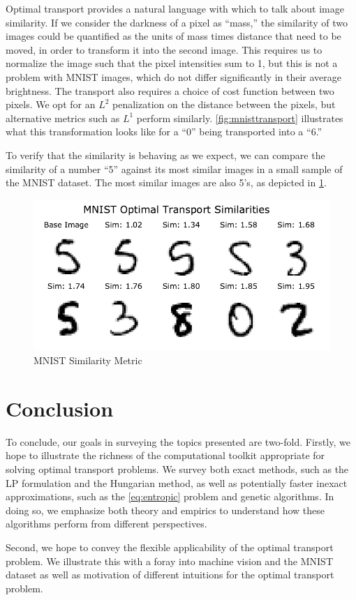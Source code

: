 \documentclass{article}
\theoremstyle{definition}
\theoremstyle{remark}
\begin{document}
Optimal transport provides a natural language with which to talk about image
similarity. If we consider the darkness of a pixel as ``mass,''  the similarity
of two images could be quantified as the units of mass times distance that need
to be moved, in order to transform it into the second image. This requires us to
normalize the image such that the pixel intensities sum to 1, but this is not a
problem with MNIST images, which do not differ significantly in their average
brightness. The transport also requires a choice of cost function between two
pixels. We opt for an $L^2$ penalization on the distance between the pixels, but
alternative metrics such as $L^1$ perform similarly. \cref{fig:mnisttransport}
illustrates what this transformation looks like for a ``0'' being transported
into a ``6.'' 

To verify that the similarity is behaving as we expect, we can compare the
similarity of a number ``5'' against its most similar images in a small sample
of the MNIST dataset. The most similar images are also 5's, as depicted in
\cref{fig:mnistsim}.


\begin{figure}[tb]
  \centering
  \includegraphics{../../code/mnist-similarity.pdf}
  \caption{MNIST Similarity Metric}
  \label{fig:mnistsim}
\end{figure}




\section{Conclusion} %
\label{sec:conclusion}

To conclude, our goals in surveying the topics presented are two-fold. Firstly,
we hope to illustrate the richness of the computational toolkit appropriate for
solving optimal transport problems. We survey both exact methods, such as the LP
formulation and the Hungarian method, as well as potentially faster inexact
approximations, such as the \eqref{eq:entropic} problem and genetic algorithms.
In doing so, we emphasize both theory and empirics to understand how these
algorithms perform from different perspectives.

Second, we hope to convey the flexible applicability of the optimal transport
problem. We illustrate this with a foray into machine vision and the MNIST
dataset as well as motivation of different intuitions for the optimal transport
problem.




\end{document}
